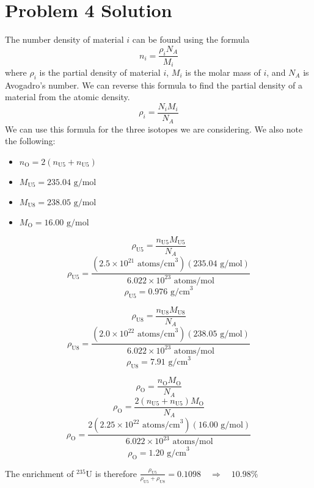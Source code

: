 \section*{Problem 4 Solution}

The number density of material $i$ can be found using the formula
$$ n_i = \frac{\rho_i N_A}{M_i} $$
where $\rho_i$ is the partial density of material $i$, $M_i$ is the molar mass of $i$, and $N_A$ is Avogadro's number. We can reverse this formula to find the partial density of a material from the atomic density.
$$ \rho_i = \frac{N_i M_i}{N_A} $$
We can use this formula for the three isotopes we are considering. We also note the following:
\begin{itemize}
\item $n_{\text{O}} = 2(n_{\text{U5}} + n_{\text{U5}})$
\item $M_{\text{U5}} = 235.04\text{ g/mol}$
\item $M_{\text{U8}} = 238.05\text{ g/mol}$
\item $M_{\text{O}} = 16.00\text{ g/mol}$
\end{itemize}

\begin{multicols}{2}
$$ \rho_{\text{U5}} = \frac{n_{\text{U5}}  M_{\text{U5}} }{N_A} $$
$$ \rho_{\text{U5}} = \frac{(2.5\times10^{21}\text{ atoms/cm}^3)(235.04\text{ g/mol}) }{6.022\times10^{23}\text{ atoms/mol}} $$
$$\boxed{ \rho_{\text{U5}} = 0.976\text{ g/cm}^3 }$$


$$ \rho_{\text{U8}} = \frac{n_{\text{U8}}  M_{\text{U8}} }{N_A} $$
$$ \rho_{\text{U8}} = \frac{(2.0\times10^{22}\text{ atoms/cm}^3)(238.05\text{ g/mol}) }{6.022\times10^{23}\text{ atoms/mol}} $$
$$\boxed{ \rho_{\text{U8}} = 7.91\text{ g/cm}^3 }$$

\end{multicols}

$$ \rho_{\text{O}} = \frac{n_{\text{O}}  M_{\text{O}} }{N_A} $$
$$ \rho_{\text{O}} = \frac{2(n_{\text{U5}} + n_{\text{U5}})  M_{\text{O}} }{N_A} $$
$$ \rho_{\text{O}} = \frac{2(2.25\times10^{22}\text{ atoms/cm}^{3})(16.00\text{ g/mol}) }{6.022\times10^{23}\text{ atoms/mol}} $$
$$\boxed{ \rho_{\text{O}} = 1.20\text{ g/cm}^3 }$$

The enrichment of $^{235}$U is therefore
$\frac{\rho_{\text{U5}}}{\rho_{\text{U5}}+\rho_{\text{U8}}} = 0.1098 \quad\Rightarrow \quad\boxed{10.98\%}$

